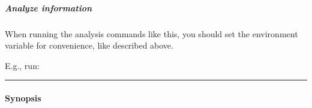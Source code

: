 \documentclass[letterpaper,10pt,english]{sphinxmanual}
\begin{document}
\subparagraph{Analyze information}
\label{\detokenize{usage/classic:analyze-information}}
When running the analysis commands like this, you should set
the  environment variable for convenience, like described above.

E.g., run:

\begin{sphinxVerbatim}[commandchars=\\\{\}]
 

 

\end{sphinxVerbatim}


\bigskip\hrule\bigskip



\paragraph{Synopsis}
\label{\detokenize{usage/classic:synopsis}}
\end{document}
